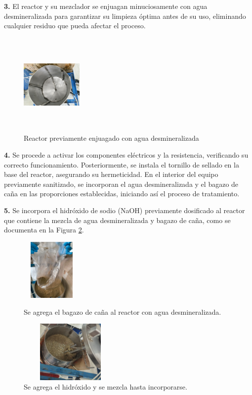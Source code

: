 \documentclass[12pt]{article}
\begin{document}
			
			
			\textbf{3.} El reactor y su mezclador se enjuagan minuciosamente con agua desmineralizada para garantizar su limpieza óptima antes de su uso, eliminando cualquier residuo que pueda afectar el proceso.
			\begin{figure} [H]
				\centering
				\includegraphics[width=3cm, height=5cm,angle=90]{imagenes/reactor limpio}
				\caption{Reactor previamente enjuagado con agua desmineralizada}
				\label{reactor limpio}
			\end{figure}
		
			\textbf{4.} Se procede a activar los componentes eléctricos y la resistencia, verificando su correcto funcionamiento. Posteriormente, se instala el tornillo de sellado en la base del reactor, asegurando su hermeticidad. En el interior del equipo previamente sanitizado, se incorporan el agua desmineralizada y el bagazo de caña en las proporciones establecidas, iniciando así el proceso de tratamiento. 
			
			\textbf{5.} Se incorpora el hidróxido de sodio (NaOH) previamente dosificado al reactor que contiene la mezcla de agua desmineralizada y bagazo de caña,  como se documenta en la Figura \ref{bagazo con hidroxido}.
		
					
					\begin{figure}[H]
				\centering
				\begin{minipage}{0.46\textwidth}
					\centering
					\includegraphics[width=3cm, height=3cm]{imagenes/agua con bagazo}
					\caption{Se agrega el bagazo de caña al reactor con agua desmineralizada.}
					\label{agua con bagazo}
				\end{minipage}
				\hfill
				\begin{minipage}{0.48\textwidth}
					\centering
				\includegraphics[width=5cm, height=3cm]{imagenes/bagazo con hidroxido1}
				\caption{Se agrega el hidróxido y se mezcla hasta incorporarse.}
				\label{bagazo con hidroxido}
				\end{minipage}
			\end{figure}
			
\end{document}
